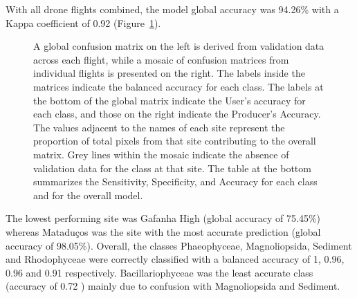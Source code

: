 \documentclass[
  number]{elsarticle}
\begin{document}
With all drone flights combined, the model global accuracy was 94.26\%
with a Kappa coefficient of 0.92 (Figure~\ref{fig-Validation}).

\label{cell-fig-Validation}
\begin{figure}[H]


\caption{\label{fig-Validation}A global confusion matrix on the left is
derived from validation data across each flight, while a mosaic of
confusion matrices from individual flights is presented on the right.
The labels inside the matrices indicate the balanced accuracy for each
class. The labels at the bottom of the global matrix indicate the User's
accuracy for each class, and those on the right indicate the Producer's
Accuracy. The values adjacent to the names of each site represent the
proportion of total pixels from that site contributing to the overall
matrix. Grey lines within the mosaic indicate the absence of validation
data for the class at that site. The table at the bottom summarizes the
Sensitivity, Specificity, and Accuracy for each class and for the
overall model.}

\end{figure}%

The lowest performing site was Gafanha High (global accuracy of 75.45\%)
whereas Mataduços was the site with the most accurate prediction (global
accuracy of 98.05\%). Overall, the classes Phaeophyceae, Magnoliopsida,
Sediment and Rhodophyceae were correctly classified with a balanced
accuracy of 1, 0.96, 0.96 and 0.91 respectively. Bacillariophyceae was
the least accurate class (accuracy of 0.72 ) mainly due to confusion
with Magnoliopsida and Sediment.
\end{document}
